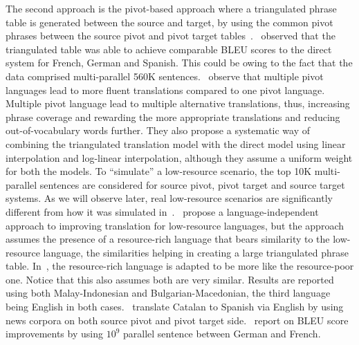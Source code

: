  The second approach is the pivot-based approach where a triangulated phrase table is generated between the source and target, by using the common pivot phrases between the source pivot and pivot target tables~\cite{Utiyama:07,Cohn:07}.~ observed that the triangulated table was able to achieve comparable BLEU scores to the direct system for French, German and Spanish. This could be owing to the fact that the data comprised multi-parallel 560K sentences.~ observe that multiple pivot languages lead to more fluent translations compared to one pivot language. Multiple pivot language lead to multiple alternative translations, thus, increasing phrase coverage and rewarding the more appropriate translations and reducing out-of-vocabulary words further. They also propose a systematic way of combining the triangulated translation model with the direct model using linear interpolation and log-linear interpolation, although they assume a uniform weight for both the models. To ``simulate'' a low-resource scenario, the top 10K multi-parallel sentences are considered for source pivot, pivot target and source target systems. As we will observe later, real low-resource scenarios are significantly different from how it was simulated in~\cite{Cohn:07}.~\cite{Nakov:12} propose a language-independent approach to improving translation for low-resource languages, but the approach assumes the presence of a resource-rich language that bears similarity to the low-resource language, the similarities helping in creating a large triangulated phrase table. In~\cite{Nakovemnlp:12}, the resource-rich language is adapted to be more like the resource-poor one. Notice that this also assumes both are very similar. Results are reported using both Malay-Indonesian and Bulgarian-Macedonian, the third language being English in both cases.~\cite{Gispert:06} translate Catalan to Spanish via English by using news corpora on both source pivot and pivot target side.~\cite{Huck:12} report on BLEU score improvements by using $10^9$ parallel sentence between German and French.

